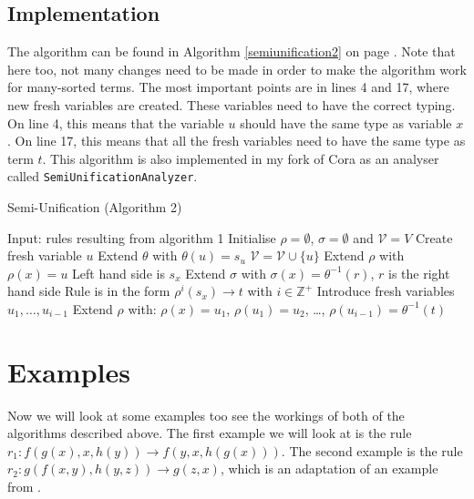 \subsection{Implementation}
The algorithm can be found in Algorithm \ref{semiunification2} on page \pageref{semiunification2}. Note that here too, not many changes need to be made in order to make the algorithm work for many-sorted terms. The most important points are in lines 4 and 17, where new fresh variables are created. These variables need to have the correct typing. On line 4, this means that the variable $u$ should have the same type as variable $x$. On line 17, this means that all the fresh variables need to have the same type as term $t$. This algorithm is also implemented in my fork of Cora as an analyser called \texttt{SemiUnificationAnalyzer}.

\begin{algorithm}
\caption{Semi-Unification (Algorithm 2)}
\label{semiunification2}
\begin{algorithmic}[1]
\STATE Input: rules resulting from algorithm 1
\STATE Initialise $\rho = \emptyset$, $\sigma = \emptyset$ and $\mathcal{V} = V$
  \STATE Create fresh variable $u$
  \STATE Extend $\theta$ with $\theta(u) = s_u$
  \STATE $\mathcal{V} = \mathcal{V} \cup \{ u \}$
  \STATE Extend $\rho$ with $\rho(x) = u$
\ENDFOR
{}
  \STATE Left hand side is $s_x$
    \STATE Extend $\sigma$ with $\sigma(x) = \theta^{-1}(r)$, $r$ is the right hand side
  \ENDIF
\ENDFOR
{}
  \STATE Rule is in the form $\rho^i(s_x) \rightarrow t$ with $i \in \mathbb{Z}^+$
  \STATE Introduce fresh variables $u_1, \dots, u_{i-1}$
  \STATE Extend $\rho$ with: $\rho(x) = u_1$, $\rho(u_1) = u_2$, \dots, $\rho(u_{i-1}) = \theta^{-1}(t)$
\ENDFOR
\end{algorithmic}
\end{algorithm}

\section{Examples}
Now we will look at some examples too see the workings of both of the algorithms described above. The first example we will look at is the rule $r_1 : f(g(x), x, h(y)) \rightarrow f(y, x, h(g(x)))$. The second example is the rule $r_2 : g(f(x, y), h(y, z)) \rightarrow g(z, x)$, which is an adaptation of an example from \cite{SemiUnification}. 

